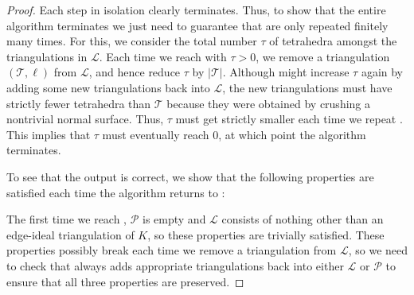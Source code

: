 \documentclass[10pt,a4paper]{amsart}
\newcommand{\tri}{\mathcal{T}}
\begin{document}
\begin{proof}
Each step in isolation clearly terminates. Thus, to show that the entire algorithm terminates we just need to
guarantee that  are only repeated finitely many times.
For this, we consider the total number $\tau$ of tetrahedra amongst the triangulations in $\mathcal{L}$.
Each time we reach  with $\tau > 0$, we remove a triangulation $(\tri,\ell)$ from $\mathcal{L}$, and hence reduce $\tau$ by $|\tri|$.
Although  might increase $\tau$ again by adding some new triangulations back into $\mathcal{L}$,
the new triangulations must have strictly fewer tetrahedra than $\tri$ because they were obtained by crushing a nontrivial normal surface.
Thus, $\tau$ must get strictly smaller each time we repeat .
This implies that $\tau$ must eventually reach $0$, at which point the algorithm terminates.

To see that the output is correct, we show that the following properties are satisfied each time the algorithm returns to :
The first time we reach , $\mathcal{P}$ is empty and $\mathcal{L}$ consists of
nothing other than an edge-ideal triangulation of $K$, so these properties are trivially satisfied.
These properties possibly break each time we remove a triangulation from $\mathcal{L}$, so we need to check that  always
adds appropriate triangulations back into either $\mathcal{L}$ or $\mathcal{P}$ to ensure that all three properties are preserved.


\end{proof}
\end{document}
